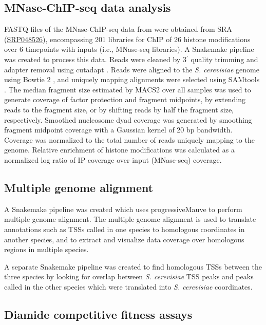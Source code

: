 \subsection{MNase-ChIP-seq data analysis}

FASTQ files of the MNase-ChIP-seq data from \citet{weiner2015} were obtained from SRA (\href{https://www.ncbi.nlm.nih.gov/sra?term=SRP048526}{SRP048526}), encompassing 201 libraries for ChIP of 26 histone modifications over 6 timepoints with inputs (i.e., MNase-seq libraries).
A Snakemake pipeline was created to process this data.
Reads were cleaned by 3$^\prime$ quality trimming and adapter removal using cutadapt \citep{martin2011}.
Reads were aligned to the \textit{S. cerevisiae} genome using Bowtie 2 \citep{langmead2012}, and uniquely mapping alignments were selected using SAMtools \citep{li2009}.
The median fragment size estimated by MACS2 \citep{zhang2008} over all samples was used to generate coverage of factor protection and fragment midpoints, by extending reads to the fragment size, or by shifting reads by half the fragment size, respectively.
Smoothed nucleosome dyad coverage was generated by smoothing fragment midpoint coverage with a Gaussian kernel of 20 bp bandwidth.
Coverage was normalized to the total number of reads uniquely mapping to the genome.
Relative enrichment of histone modifications was calculated as a normalized log ratio of IP coverage over input (MNase-seq) coverage.

\subsection{Multiple genome alignment}

A Snakemake pipeline was created which uses progressiveMauve \citep{darling2010} to perform multiple genome alignment.
The multiple genome alignment is used to translate annotations such as TSSs called in one species to homologous coordinates in another species, and to extract and visualize data coverage over homologous regions in multiple species.

A separate Snakemake pipeline was created to find homologous TSSs between the three species by looking for overlap between \textit{S. cerevisiae} TSS peaks and peaks called in the other species which were translated into \textit{S. cerevisiae} coordinates.

\subsection{Diamide competitive fitness assays}

\newpage

\begingroup
\singlespacing

\endgroup
